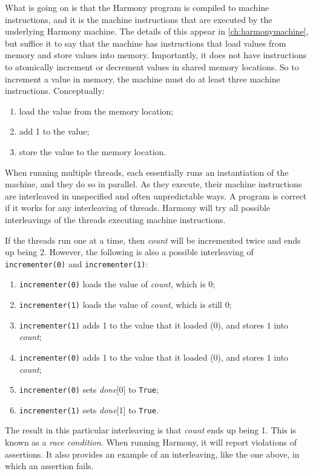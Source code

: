 \documentclass{report}
\begin{document}
What is going on is that the Harmony program is compiled to machine instructions,
%
and it is the machine instructions that are executed by the underlying Harmony
machine.  The details of this appear in \autoref{ch:harmonymachine},
but suffice it to
say that the machine has instructions that load values from memory and store
values into memory.  Importantly, it does not have instructions to atomically
increment or decrement values in shared memory locations.
So to increment a value in memory,
the machine must do at least three machine instructions.  Conceptually:
\begin{enumerate}
\item load the value from the memory location;
\item add 1 to the value;
\item store the value to the memory location.
\end{enumerate}

When running multiple threads, each essentially runs an instantiation of
the machine, and they do so in parallel.  As they execute, their machine
instructions are interleaved
%
in unspecified and often unpredictable ways.
A program is correct if it works for any interleaving of threads.
Harmony will try all possible interleavings of the threads
executing machine instructions.

If the threads run one at a time, then \textit{count} will be incremented
twice and ends up being 2.  However, the following is also
a possible interleaving of \texttt{incrementer(0)} and \texttt{incrementer(1)}:
\begin{enumerate}
\item \texttt{incrementer(0)} loads the value of \textit{count}, which is 0;
\item \texttt{incrementer(1)} loads the value of \textit{count}, which is still 0;
\item \texttt{incrementer(1)} adds 1 to the value that it loaded (0), and
stores $1$ into \textit{count};
\item \texttt{incrementer(0)} adds 1 to the value that it loaded (0), and
stores $1$ into \textit{count};
\item \texttt{incrementer(0)} sets \textit{done}[0] to \texttt{True};
\item \texttt{incrementer(1)} sets \textit{done}[1] to \texttt{True}.
\end{enumerate}

The result in this particular interleaving is that \textit{count} ends up
being 1.
This is known as a \emph{race condition}.
%
When running Harmony, it will
report violations of assertions.  It also provides an example
of an interleaving, like the one above, in which an assertion fails.
\end{document}
